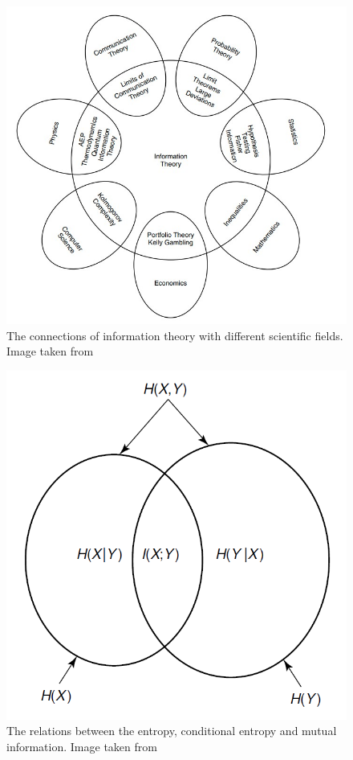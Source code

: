 \documentclass[12pt,%
               a4paper,%
               oneside,openany,%
               titlepage,%
               headinclude,footinclude,%
               BCOR5mm,%
               cleardoublepage=empty,%
               tablecaptionabove,%
               floatperchapter,
               ]{scrreprt}                 %
\begin{document}
\begin{figure}[h]
\begin{center}
\includegraphics[width=1\textwidth]{Figures/Information_theory_connections.jpg}
\caption{The connections of information theory with different scientific fields. Image taken from \cite{cover2006elements}}
\label{Information_theory_connections}
\end{center}
\end{figure}


\begin{figure}[h]
\begin{center}
\includegraphics[width=1\textwidth]{Figures/Entropy_MI.png}
\caption{The relations between the entropy, conditional entropy and mutual information. Image taken from \cite{cover2006elements}}
\label{Entropy_MI}
\end{center}
\end{figure}
\end{document}
